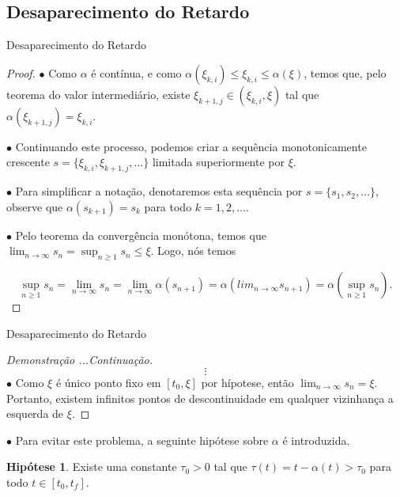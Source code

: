 \documentclass{beamer}
\theoremstyle{plain}
\theoremstyle{definition}
\newtheorem{hip}{Hipótese}
\begin{document}

\subsection{Desaparecimento do Retardo}
\begin{frame}{Desaparecimento do Retardo}

    \begin{proof}
        $\bullet$ Como $\alpha$ é contínua, e como $\alpha(\xi_{k,i}) \leq \xi_{k, i} \leq  \alpha(\xi)$, temos que, pelo teorema do valor intermediário, existe $\xi_{k+1, j} \in (\xi_{k,i}, \xi)$ tal que $\alpha(\xi_{k+1, j}) = \xi_{k,i}$. 

        $\bullet$ Continuando este processo, podemos criar a sequência monotonicamente crescente $s = \{\xi_{k, i}, \xi_{k+1, j}, ...\}$ limitada superiormente por $\xi$. 

        $\bullet$ Para simplificar a notação, denotaremos esta sequência por $s = \{ s_1, s_2, \dots \}$, observe que $\alpha(s_{k+1}) = s_k$ para todo $k = 1, 2, \dots$. 

        $\bullet$ Pelo teorema da convergência monótona, temos que $\lim_{n \to \infty} s_n = \sup_{n \geq 1} s_n \leq \xi$. Logo, nós temos

        \noindent
        \[
            \sup_{n \geq 1} s_n = \lim_{n \to \infty} s_n  = 
            \lim_{n \to \infty} \alpha(s_{n+1}) = 
            \alpha(lim_{n \to \infty} s_{n+1}) = 
            \alpha\left(\sup_{n \geq 1} s_n \right).
        \]

    \renewcommand{\qedsymbol}{}

    \end{proof}
\end{frame}


\begin{frame}{Desaparecimento do Retardo}


    \begin{proof}[Demonstração ...Continuação]
        \[
            \vdots
        \]
        $\bullet$ Como $\xi$ é único ponto fixo em $[t_0, \xi]$ por hípotese, então $\lim_{n \to \infty} s_n = \xi$. Portanto, existem infinitos pontos de descontinuidade em qualquer vizinhança a esquerda de $\xi$.
    \end{proof}

    $\bullet$ Para evitar este problema, a seguinte hipótese sobre $\alpha$ é introduzida.

    \begin{hip}
        Existe uma constante $ \tau_0 > 0 $ tal que $ \tau(t) = t - \alpha(t) > \tau_0 $ para todo $ t \in [t_0, t_f] $.
        \label{H1:hipotese:hypothesis}
    \end{hip}


\end{frame}
\end{document}
